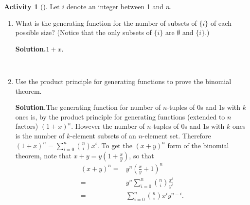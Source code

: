 \documentclass[10pt,]{book}
\theoremstyle{plain}
\theoremstyle{definition}
\newtheorem{activity}[project]{Activity}
\numberwithin{equation}{chapter}
\newcommand{\amp}{&}
\begin{document}
\begin{activity}[]\label{activity-180}
Let \(i\) denote an integer between 1 and \(n\).%
~\par
\begin{enumerate}[label=(\alph*)]
 \item What is the generating function for the number of subsets of \(\{i\}\) of each possible size? (Notice that the only subsets of \(\{i\}\) are \(\emptyset\) and \(\{i\}\).)%
\par\medskip\noindent%
\textbf{Solution.}\quad \(1+x\).%

~\par
\item Use the product principle for generating functions to prove the binomial theorem.%
\par\medskip\noindent%
\textbf{Solution.}\quad The generating function for number of \(n\)-tuples of 0s and 1s with \(k\) ones is, by the product principle for generating functions (extended to \(n\) factors) \((1+x)^n\). However the number of \(n\)-tuples of 0s and 1s with \(k\) ones is the number of \(k\)-element subsets of an \(n\)-element set. Therefore \((1+x)^n =\sum_{i=0}^n \binom{n}{i}x^i\). To get the \((x+y)^n\) form of the binomial theorem, note that \(x+y = y(1+\frac{x}{y})\), so that%
\begin{align*}
(x+y)^n  =\amp  y^n\left(\frac{x}{y}+1\right)^n\\
=\amp y^n\sum_{i=0}^n \binom{n}{i}\frac{x^i}{y^i}\\
=\amp  \sum_{i=0}^n\binom{n}{i}x^iy^{n-i}.
\end{align*}
%

\end{enumerate}
\end{activity}
\typeout{************************************************}
\typeout{************************************************}
\end{document}
